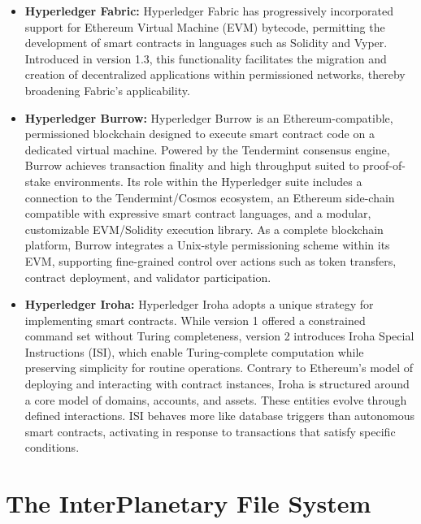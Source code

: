 \documentclass[final]{rc-book-2.14}
\begin{document}
\begin{itemize}

    \item \textbf{Hyperledger Fabric:} Hyperledger Fabric has progressively incorporated support for Ethereum Virtual Machine (EVM) bytecode, permitting the development of smart contracts in languages such as Solidity and Vyper. Introduced in version 1.3, this functionality facilitates the migration and creation of decentralized applications within permissioned networks, thereby broadening Fabric's applicability\cite{hyperledger2018fabric}.

    \item \textbf{Hyperledger Burrow:} Hyperledger Burrow is an Ethereum-compatible, permissioned blockchain designed to execute smart contract code on a dedicated virtual machine. Powered by the Tendermint consensus engine, Burrow achieves transaction finality and high throughput suited to proof-of-stake environments. Its role within the Hyperledger suite includes a connection to the Tendermint/Cosmos ecosystem, an Ethereum side-chain compatible with expressive smart contract languages, and a modular, customizable EVM/Solidity execution library\cite{hyperledger2019burrow}. As a complete blockchain platform, Burrow integrates a Unix-style permissioning scheme within its EVM, supporting fine-grained control over actions such as token transfers, contract deployment, and validator participation\cite{monax2020burrow}.

    \item \textbf{Hyperledger Iroha:} Hyperledger Iroha adopts a unique strategy for implementing smart contracts. While version 1 offered a constrained command set without Turing completeness, version 2 introduces Iroha Special Instructions (ISI), which enable Turing-complete computation while preserving simplicity for routine operations. Contrary to Ethereum’s model of deploying and interacting with contract instances, Iroha is structured around a core model of domains, accounts, and assets. These entities evolve through defined interactions. ISI behaves more like database triggers than autonomous smart contracts, activating in response to transactions that satisfy specific conditions\cite{hyperledger2020iroha}.

\end{itemize}

\section{The InterPlanetary File System}
\label{chp:background:sec:ipfs}
\end{document}
